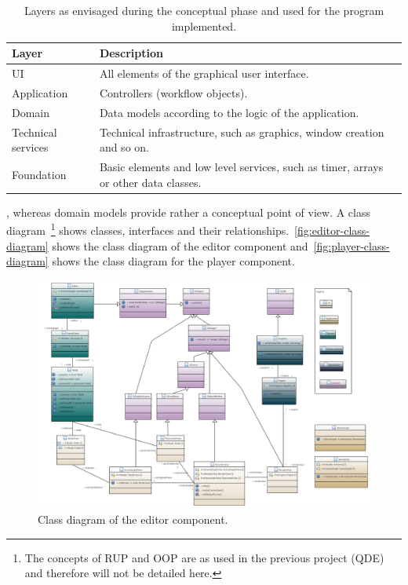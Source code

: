 \documentclass[%
    a4paper,    %
    justified,  %
    nobib,      %
    openany     %
]{tufte-book}
\begin{document}
\begin{table}[h]
  \caption{Layers as envisaged during the conceptual phase and used for
    the program implemented.}
  \label{table:layers}
  \begin{tabularx}{\textwidth}{lX}
    \toprule
    \textbf{Layer} & \textbf{Description}\\
    \midrule
    UI                 & All elements of the graphical user interface.                                       \\
    Application        & Controllers (workflow objects).                                                     \\
    Domain             & Data models according to the logic of the application.                              \\
    Technical services & Technical infrastructure, such as graphics, window creation and so on.              \\
    Foundation         & Basic elements and low level services, such as timer, arrays or other data classes. \\
    \bottomrule
  \end{tabularx}
\end{table}

,
whereas domain models provide rather a conceptual point of view. A class
diagram~\footnote{The concepts of RUP and OOP are as used in the previous
project (QDE) and therefore will not be detailed here.} shows classes,
interfaces and their relationships.~\autoref{fig:editor-class-diagram} shows the
class diagram of the editor component and~\autoref{fig:player-class-diagram}
shows the class diagram for the player component.

\begin{figure}[ht]
  \caption{Class diagram of the editor component.}
  \label{fig:editor-class-diagram}
  \includegraphics[width=0.95\linewidth]{images/editor-class-diagram}
\end{figure}
\end{document}
